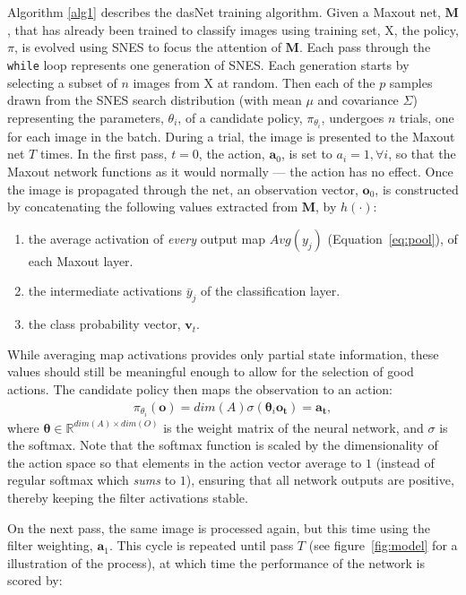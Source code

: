 Algorithm \ref{alg1} describes the dasNet training algorithm.  Given a
Maxout net, $\mathbf{M}$, that has already been trained to classify
images using training set, X, the policy, $\pi$, is evolved using SNES
to focus the attention of $\mathbf{M}$.  Each pass through the {\tt
  while} loop represents one generation of SNES.  Each generation
starts by selecting a subset of $n$ images from X at random.
Then each of the $p$ samples drawn from the SNES search distribution
(with mean $\mu$ and covariance $\Sigma$) representing the parameters,
$\theta_i$, of a candidate policy, $\pi_{\theta_i}$, undergoes $n$ trials,
one for each image in the batch.  During a trial, the image is
presented to the Maxout net $T$ times.  In the first pass, $t=0$, the
action, ${\mathbf a}_0$, is set to $a_{i}=1, \forall i$, so that
the Maxout network functions as it would normally --- the action has no effect.
Once the image is propagated through the net, an observation vector,
${\mathbf o}_0$, is constructed by concatenating the following
values extracted from $\mathbf{M}$, by $h(\cdot)$:
\begin{enumerate}
\item the average activation of \emph{every} output map $Avg(y_j)$
  (Equation~\ref{eq:pool}), of each Maxout layer.
\item the intermediate activations $\bar{y}_j$ of the classification
  layer.
\item the class probability vector,  $\mathbf{v}_t$.
\end{enumerate}
 While 
averaging map activations provides only partial state information,
these values should still be meaningful enough to allow for the
selection of good actions.
The candidate policy then maps the observation to an action:
\begin{align}
\pi_{\theta_i}(\mathbf{o}) = dim(A) \sigma(\boldsymbol{\theta}_i
\mathbf{o_t}) = \mathbf{a_t},
\end{align}
where $\boldsymbol{\theta} \in \mathbb{R}^{dim(A) \times dim(O)}$ is
the weight matrix of the neural network, and $\sigma$ is the softmax.
Note that the softmax function is scaled by the dimensionality of the
action space so that elements in the action vector average to $1$
(instead of regular softmax which \emph{sums} to $1$), ensuring that
all network outputs are positive, thereby keeping the filter
activations stable.

On the next pass, the same image is processed again, but this time
using the filter weighting, ${\mathbf a}_1$.  This cycle is
repeated until pass $T$ (see figure~\ref{fig:model} for a
illustration of the process), at which time the performance of the
network is scored by:

